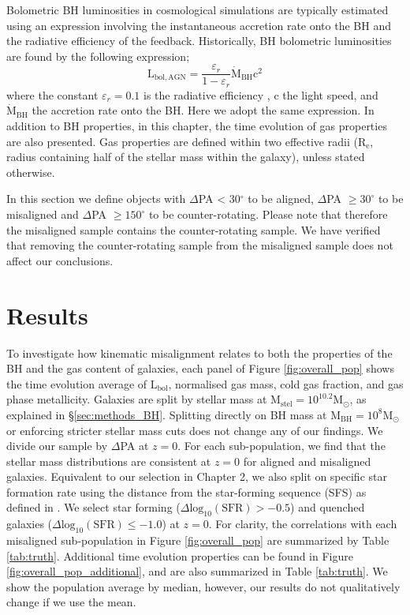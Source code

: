 Bolometric BH luminosities in cosmological simulations are typically estimated using an expression involving the instantaneous accretion rate onto the BH and the radiative efficiency of the feedback. Historically, BH bolometric luminosities are found by the following expression;
\begin{equation}
\mathrm{L_{bol, AGN}} = \frac{\varepsilon_r}{1 - \varepsilon_r} \dot{\mathrm{M}}_{\mathrm{BH}} \mathrm{c^2}
\end{equation}
where the constant $\varepsilon_r=0.1$ is the radiative efficiency \citep[see discussion in][]{habouzit2019}, c the light speed, and $\dot{\mathrm{M}}_{\mathrm{BH}}$ the accretion rate onto the BH. Here we adopt the same expression. In addition to BH properties, in this chapter, the time evolution of gas properties are also presented. Gas properties are defined within two effective radii ($\mathrm{R_{e}}$, radius containing half of the stellar mass within the galaxy), unless stated otherwise. 

In this section we define objects with $\Delta$PA < 30$^{\circ}$ to be aligned, $\Delta$PA $ \geq 30^{\circ}$ to be misaligned and $\Delta$PA $\geq 150^{\circ}$ to be counter-rotating. Please note that therefore the misaligned sample contains the counter-rotating sample. We have verified that removing the counter-rotating sample from the misaligned sample does not affect our conclusions.

\section{Results} \label{sec:results_BH}
To investigate how kinematic misalignment relates to both the properties of the BH and the gas content of galaxies, each panel of Figure \ref{fig:overall_pop} shows the time evolution average of $\mathrm{L_{bol}}$, normalised gas mass, cold gas fraction, and gas phase metallicity. Galaxies are split by stellar mass at $\mathrm{M_{stel} = 10^{10.2}M_{\odot}}$, as explained in \S\ref{sec:methods_BH}. Splitting directly on BH mass at $\mathrm{M_{BH} = 10^{8}M_{\odot}}$ or enforcing stricter stellar mass cuts does not change any of our findings. We divide our sample by $\Delta$PA at $z=0$. For each sub-population, we find that the stellar mass distributions are consistent at $z=0$ for aligned and misaligned galaxies. Equivalent to our selection in Chapter 2, we also split on specific star formation rate using the distance from the star-forming sequence (SFS) as defined in \citet{pillepich2019}. We select star forming ($\Delta \mathrm{log_{10}(SFR) > -0.5}$) and quenched galaxies ($\Delta \mathrm{log_{10}(SFR) \leq -1.0}$) at $z=0$. For clarity, the correlations with each misaligned sub-population in Figure \ref{fig:overall_pop} are summarized by Table \ref{tab:truth}. Additional time evolution properties can be found in Figure \ref{fig:overall_pop_additional}, and are also summarized in Table \ref{tab:truth}. We show the population average by median, however, our results do not qualitatively change if we use the mean.

